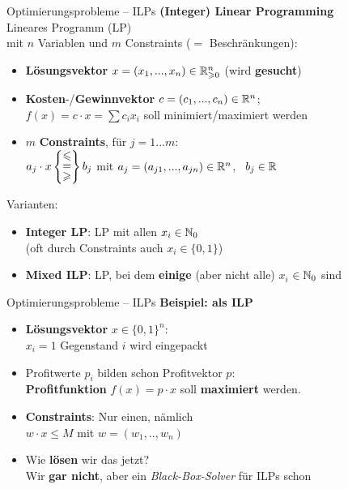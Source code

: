 \begin{frame}{Optimierungsprobleme – ILPs}
	\textbf{(Integer) Linear Programming} \\
	Lineares Programm (LP) \\ mit $n$ Variablen und $m$ Constraints ($=$ Beschränkungen):   %
	\begin{itemize}
		\pause
		\item \textbf{Lösungsvektor} $x = (x_1, ..., x_n) \in \mathbb{R}_{\geqslant0}^n$ (wird \textbf{gesucht})
		\pause
		\item \textbf{Kosten}-/\textbf{Gewinnvektor} $c = (c_1, ..., c_n)\in \mathbb{R}^n$; \\ 
		$f(x) = c \cdot x = \sum c_i  x_i $ soll minimiert/maximiert werden
		\pause
		\item $m$ \textbf{Constraints}, \quad für $j = 1...m$: \\ \vspace{.1\baselineskip}
		\quad $a_j \cdot x \braced{\stackedtight{\leq \\ = \\ \geq}} b_j$ \quad mit $a_j = (a_{j1}, ..., a_{jn}) \in \mathbb{R}^n$, \ $b_j \in \mathbb{R}$  %
	\end{itemize}
	\pause
	Varianten:
	\begin{itemize}
		\item \textbf{Integer LP}: LP mit allen $x_i \in \mathbb{N}_0$ \\
		(oft durch Constraints auch $x_i \in \{0, 1\}$)
		\pause
		\item \textbf{Mixed ILP}: LP, bei dem \textbf{einige} (aber nicht alle) $x_i$ $\in \mathbb{N}_0$ sind
	\end{itemize}
\end{frame}

\begin{frame}{Optimierungsprobleme – ILPs}
	\textbf{Beispiel: \Knapsack als ILP} 
	\begin{itemize} %
		\item \textbf{Lösungsvektor} $x \in \{0, 1\}^n$: \\ 
		\quad  $x_i = 1$ \gdw Gegenstand $i$ wird eingepackt
		\pause 
		\item Profitwerte $p_i$ bilden schon Profitvektor $p$: \\ \impl \textbf{Profitfunktion} $f(x) = p \cdot x$ soll \textbf{maximiert} werden.
		\pause
		\item \textbf{Constraints}: Nur einen, nämlich \\
		 \quad $w \cdot x \leq M$ \quad mit $w = (w_1,..,w_n)$
		\pause
		\forcenewline
		\forcenewline
		\item Wie \textbf{lösen} wir das jetzt? \\
		\impl Wir \textbf{gar nicht}, aber ein \textit{Black-Box-Solver} für ILPs schon \smiley
	\end{itemize}
\end{frame}


